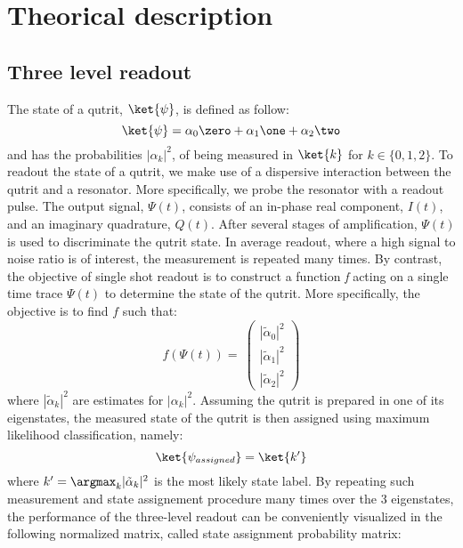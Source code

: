 \section{Theorical description}
\subsection{Three level readout}
\label{s:high_level_description}
The state of a qutrit, $\ket{\psi}$, is defined as follow:
\begin{equation}
    \ket{\psi} = \alpha_0 \zero + \alpha_1 \one + \alpha_2 \two
\end{equation}
and has the probabilities $|\alpha_k|^2$, of being measured in $\ket{k}$ for $k \in \{0,1,2\}$.
To readout the state of a qutrit, we make use of a dispersive interaction between the qutrit and a resonator. More specifically, we probe the resonator with a readout pulse. The output signal, $\Psi(t)$, consists of an in-phase real component, $I(t)$, and an imaginary quadrature, $Q(t)$. After several stages of amplification, $\Psi(t)$ is used to discriminate the qutrit state.  In average readout, where a high signal to noise ratio is of interest, the measurement is repeated many times. By contrast, the objective of single shot readout is to construct a function \textit{f} acting on a single time trace $\Psi(t)$ to determine the state of the qutrit. More specifically,  the objective is to find $f$ such that:
\begin{equation}
\label{eq:high_level_description:f}
    f\left(\Psi(t)\right)=\ \left( \begin{array}{c}
|\tilde{\alpha}_0|^2\\ 
|\tilde{\alpha}_1|^2\\ 
|\tilde{\alpha}_2|^2\end{array}
\right)
\end{equation}
where $|\tilde{\alpha}_k|^2$ are estimates for $|\alpha_k|^2$. Assuming the qutrit is prepared in one of its eigenstates, the measured state of the qutrit is then assigned using maximum likelihood classification, namely:
\begin{equation} \label{eq:max_likelihood_state}
    \ket{\psi_{assigned}} = \ket{k'}
\end{equation}
where $k' = \argmax_k |\tilde{\alpha}_k|^2$ is the most likely state label.
By repeating such measurement and state assignement procedure many times over the 3 eigenstates, the performance of the three-level readout can be conveniently visualized in the following normalized matrix, called state assignment probability matrix:

